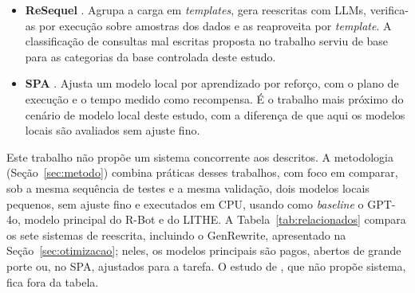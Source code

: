 \documentclass[12pt]{article}
\begin{document}
\begin{itemize}
\item \textbf{ReSequel} \cite{fathollahzadeh2026resequel}. Agrupa a carga em \textit{templates}, gera reescritas com LLMs, verifica-as por execução sobre amostras dos dados e as reaproveita por \textit{template}. A classificação de consultas mal escritas proposta no trabalho serviu de base para as categorias da base controlada deste estudo.

\item \textbf{SPA} \cite{huang2026spa}. Ajusta um modelo local por aprendizado por reforço, com o plano de execução e o tempo medido como recompensa. É o trabalho mais próximo do cenário de modelo local deste estudo, com a diferença de que aqui os modelos locais são avaliados sem ajuste fino.
\end{itemize}

Este trabalho não propõe um sistema concorrente aos descritos. A metodologia (Seção~\ref{sec:metodo}) combina práticas desses trabalhos, com foco em comparar, sob a mesma sequência de testes e a mesma validação, dois modelos locais pequenos, sem ajuste fino e executados em CPU, usando como \textit{baseline} o GPT-4o, modelo principal do R-Bot e do LITHE. A Tabela~\ref{tab:relacionados} compara os sete sistemas de reescrita, incluindo o GenRewrite, apresentado na Seção~\ref{sec:otimizacao}; neles, os modelos principais são pagos, abertos de grande porte ou, no SPA, ajustados para a tarefa. O estudo de \textcite{amaral2025}, que não propõe sistema, fica fora da tabela.
\end{document}
